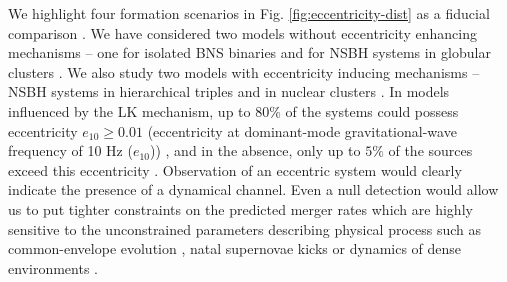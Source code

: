 We highlight four formation scenarios in Fig. \ref{fig:eccentricity-dist} as a fiducial comparison \cite{Belczynski:2017mqx,Sedda:2020wzl,Trani:2021tan,Fragione:2018yrb}. We have considered two models without eccentricity enhancing mechanisms -- one for isolated BNS binaries \cite{Belczynski:2017mqx} and for NSBH systems in globular clusters \cite{Sedda:2020wzl}. We also study two models with eccentricity inducing mechanisms -- NSBH systems in hierarchical triples \cite{Trani:2021tan} and in nuclear clusters \cite{Fragione:2018yrb}. In models influenced by the LK mechanism, up to $80\%$ of the systems could possess eccentricity $e_{10} \geq 0.01$ (eccentricity at dominant-mode gravitational-wave frequency of 10 Hz ($e_{10}$)) \cite{Hamers:2019oeq, Fragione:2018yrb,Trani:2021tan, Silsbee:2016djf,Rodriguez:2018jqu}, and in the absence, only up to $5\%$ of the sources exceed this eccentricity \cite{Sedda:2020wzl, Belczynski:2017mqx}. Observation of an eccentric system would clearly indicate the presence of a dynamical channel. Even a null detection would allow us to put tighter constraints on the predicted merger rates which are highly sensitive to the unconstrained parameters describing physical process such as common-envelope evolution \cite{Marchant:2021hiv,Santoliquido:2020bry, Baibhav:2019gxm}, natal supernovae kicks \cite{Belczynski:2001uc,Hamers:2019oeq,Trani:2021tan,Santoliquido:2020bry,Silsbee:2016djf, Richards:2022fnq, Baibhav:2019gxm} or dynamics of dense environments \cite{Fragione:2018yrb,Ford:2021kcw,Petrovich:2017otm}. 


